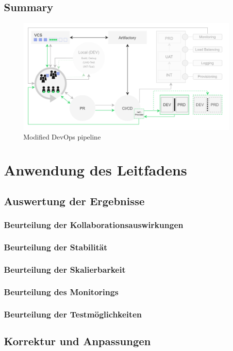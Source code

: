 \documentclass[11pt]{article}
\begin{document}
\subsection{Summary}
\begin{figure}[H]
\caption{Modified DevOps pipeline}
\label{fig:devopsModified}
\centering
\includegraphics[width=1\textwidth]{DevOps modified}
\end{figure}
\newpage
\section{Anwendung des Leitfadens}
\subsection{Auswertung der Ergebnisse}
\subsubsection{Beurteilung der Kollaborationsauswirkungen}
\subsubsection{Beurteilung der Stabilität}
\subsubsection{Beurteilung der Skalierbarkeit} 
\subsubsection{Beurteilung des Monitorings}
\subsubsection{Beurteilung der Testmöglichkeiten} 
\subsection{Korrektur und Anpassungen}
\end{document}
